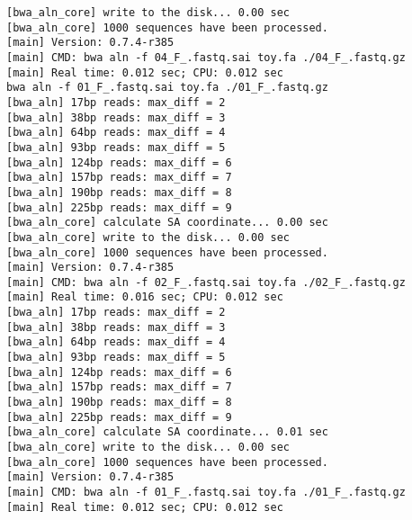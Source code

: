 \documentclass{article}
\begin{document}
\begin{lstlisting}
[bwa_aln_core] write to the disk... 0.00 sec
[bwa_aln_core] 1000 sequences have been processed.
[main] Version: 0.7.4-r385
[main] CMD: bwa aln -f 04_F_.fastq.sai toy.fa ./04_F_.fastq.gz
[main] Real time: 0.012 sec; CPU: 0.012 sec
bwa aln -f 01_F_.fastq.sai toy.fa ./01_F_.fastq.gz
[bwa_aln] 17bp reads: max_diff = 2
[bwa_aln] 38bp reads: max_diff = 3
[bwa_aln] 64bp reads: max_diff = 4
[bwa_aln] 93bp reads: max_diff = 5
[bwa_aln] 124bp reads: max_diff = 6
[bwa_aln] 157bp reads: max_diff = 7
[bwa_aln] 190bp reads: max_diff = 8
[bwa_aln] 225bp reads: max_diff = 9
[bwa_aln_core] calculate SA coordinate... 0.00 sec
[bwa_aln_core] write to the disk... 0.00 sec
[bwa_aln_core] 1000 sequences have been processed.
[main] Version: 0.7.4-r385
[main] CMD: bwa aln -f 02_F_.fastq.sai toy.fa ./02_F_.fastq.gz
[main] Real time: 0.016 sec; CPU: 0.012 sec
[bwa_aln] 17bp reads: max_diff = 2
[bwa_aln] 38bp reads: max_diff = 3
[bwa_aln] 64bp reads: max_diff = 4
[bwa_aln] 93bp reads: max_diff = 5
[bwa_aln] 124bp reads: max_diff = 6
[bwa_aln] 157bp reads: max_diff = 7
[bwa_aln] 190bp reads: max_diff = 8
[bwa_aln] 225bp reads: max_diff = 9
[bwa_aln_core] calculate SA coordinate... 0.01 sec
[bwa_aln_core] write to the disk... 0.00 sec
[bwa_aln_core] 1000 sequences have been processed.
[main] Version: 0.7.4-r385
[main] CMD: bwa aln -f 01_F_.fastq.sai toy.fa ./01_F_.fastq.gz
[main] Real time: 0.012 sec; CPU: 0.012 sec
\end{lstlisting}
\end{document}

